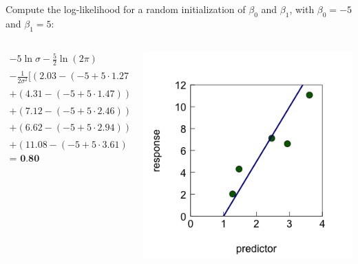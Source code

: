 \documentclass{beamer}
\begin{document}
\begin{frame}
    \frametitle{}
    Compute the log-likelihood for a random initialization of $\beta_0$ and $\beta_1$, with $\beta_0 = -5$ and $\beta_1 = 5$:
    
    \vspace{0.5cm}
    
    \begin{columns}
        \begin{column}{0.5\textwidth}
            \begin{multline*}
            -5 \ln \sigma - \frac 52 \ln (2 \pi) \\
            - \frac{1}{2 \sigma^2} [( 2.03 - (-5 + 5 \cdot 1.27))^2 \\
            + ( 4.31 - (-5 + 5 \cdot 1.47))^2 \\
            + ( 7.12 - (-5 + 5 \cdot 2.46))^2 \\
            + ( 6.62 - (-5 + 5 \cdot 2.94))^2 \\
            + ( 11.08 - (-5 + 5 \cdot 3.61))^2] \\
            \textbf{= 0.80}
            \end{multline*}  
        \end{column}
        
        \begin{column}{0.5\textwidth}
            \centering
            \includegraphics[width=\textwidth]{lectures/day_2_LM_refresh_I/figures/unnamed-chunk-23-1.png}
        \end{column}
    \end{columns}
\end{frame}
\end{document}
